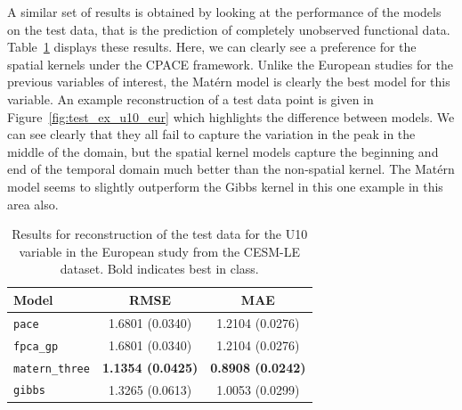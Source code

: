 A similar set of results is obtained by looking at the performance of the models on the test data, that is the prediction of completely unobserved functional data.
Table~\ref{tab:test_cesm_u10_eur} displays these results.
Here, we can clearly see a preference for the spatial kernels under the CPACE framework.
Unlike the European studies for the previous variables of interest, the Mat\'ern model is clearly the best model for this variable.
An example reconstruction of a test data point is given in Figure~\ref{fig:test_ex_u10_eur} which highlights the difference between models. 
We can see clearly that they all fail to capture the variation in the peak in the middle of the domain, but the spatial kernel models capture the beginning and end of the temporal domain much better than the non-spatial kernel. 
The Mat\'ern model seems to slightly outperform the Gibbs kernel in this one example in this area also. 

\begin{table}
	\caption[Results for the U10 variable on test data in the European study.]{Results for reconstruction of the test data for the U10 variable in the European study from the CESM-LE dataset. Bold indicates best in class.}
	\centering
	\label{tab:test_cesm_u10_eur}
	\begin{tabular}{lcc}
		\toprule
		\textbf{Model} & \textbf{RMSE} & \textbf{MAE} \\
		\midrule
		\verb*|pace| & 1.6801 (0.0340) & 1.2104	(0.0276) \\
		\verb*|fpca_gp| & 1.6801 (0.0340) & 1.2104 (0.0276) \\
		\verb*|matern_three| & \textbf{1.1354 (0.0425)} & \textbf{0.8908 (0.0242)}\\
		\verb*|gibbs| & 1.3265 (0.0613) & 1.0053 (0.0299)\\
		\bottomrule
	\end{tabular}
\end{table}


